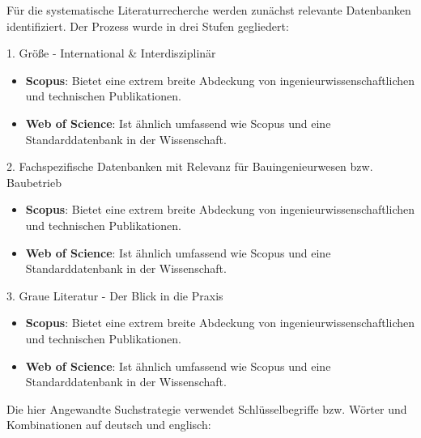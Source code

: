 
Für die systematische Literaturrecherche werden zunächst relevante Datenbanken identifiziert. Der Prozess wurde in drei Stufen gegliedert:

1. Größe - International \& Interdisziplinär
\begin{itemize}[leftmargin=2em]
    \item \textbf{Scopus}: Bietet eine extrem breite Abdeckung von ingenieurwissenschaftlichen und technischen Publikationen.
    \item \textbf{Web of Science}: Ist ähnlich umfassend wie Scopus und eine Standarddatenbank in der Wissenschaft.
\end{itemize}
2. Fachspezifische Datenbanken mit Relevanz für Bauingenieurwesen bzw. Baubetrieb
\begin{itemize}[leftmargin=2em]
    \item \textbf{Scopus}: Bietet eine extrem breite Abdeckung von ingenieurwissenschaftlichen und technischen Publikationen.
    \item \textbf{Web of Science}: Ist ähnlich umfassend wie Scopus und eine Standarddatenbank in der Wissenschaft.
\end{itemize}
3. Graue Literatur - Der Blick in die Praxis
\begin{itemize}[leftmargin=2em]
    \item \textbf{Scopus}: Bietet eine extrem breite Abdeckung von ingenieurwissenschaftlichen und technischen Publikationen.
    \item \textbf{Web of Science}: Ist ähnlich umfassend wie Scopus und eine Standarddatenbank in der Wissenschaft.
\end{itemize}

Die hier Angewandte Suchstrategie verwendet Schlüsselbegriffe bzw. Wörter und Kombinationen auf deutsch und englisch:

